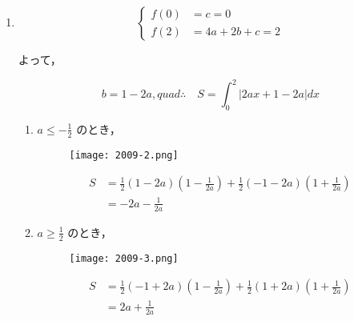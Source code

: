 \documentclass[a4paper]{ltjsarticle}
\begin{document}
\begin{enumerate}[label=(\arabic*)]
    \item

          \begin{equation*}
              \left\{\begin{aligned}
                  f(0) & =c=0       \\
                  f(2) & =4a+2b+c=2
              \end{aligned}\right.
          \end{equation*}

          よって，

          \begin{equation*}
              b=1-2a,quad\therefore\quad S=\int_{0}^{2}|2ax+1-2a|dx
          \end{equation*}

          \begin{enumerate}[label=(\roman*)]
              \item $a\leq -\frac{1}{2}$ のとき，

                    \begin{figure}[!ht]
                        \centering
                        \texttt{[image: 2009-2.png]}
                    \end{figure}

                    \begin{align*}
                        S & =\frac{1}{2}(1-2a)\left(1-\frac{1}{2a}\right)+\frac{1}{2}(-1-2a)\left(1+\frac{1}{2a}\right) \\
                          & =-2a-\frac{1}{2a}
                    \end{align*}

              \item $a\geq \frac{1}{2}$ のとき，

                    \begin{figure}[!ht]
                        \centering
                        \texttt{[image: 2009-3.png]}
                    \end{figure}

                    \begin{align*}
                        S & =\frac{1}{2}(-1+2a)\left(1-\frac{1}{2a}\right)+\frac{1}{2}(1+2a)\left(1+\frac{1}{2a}\right) \\
                          & =2a+\frac{1}{2a}
                    \end{align*}


\end{enumerate}
\end{enumerate}
\end{document}

